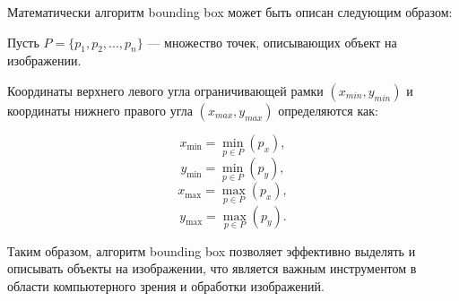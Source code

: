 Математически алгоритм bounding box может быть описан следующим образом:

Пусть \( P = \{p_1, p_2, ..., p_n\} \) — множество точек, описывающих объект на изображении.

Координаты верхнего левого угла ограничивающей рамки $(x_{min}, y_{min})$ и координаты нижнего правого угла $(x_{max}, y_{max})$ определяются как:

\[ x_{\text{min}} = \min_{p \in P} (p_x), \]
\[ y_{\text{min}} = \min_{p \in P} (p_y), \]
\[ x_{\text{max}} = \max_{p \in P} (p_x), \]
\[ y_{\text{max}} = \max_{p \in P} (p_y). \]

Таким образом, алгоритм bounding box позволяет эффективно выделять и описывать объекты на изображении, что является важным инструментом в области компьютерного зрения и обработки изображений.



